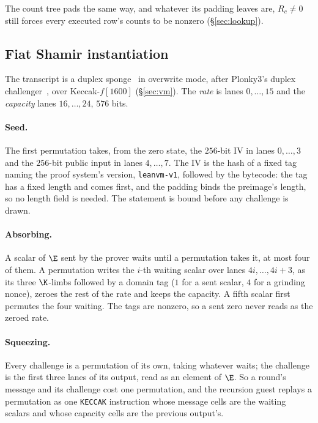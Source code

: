 The count tree pads the same way, and whatever its padding leaves are, $R_c\neq0$ still forces every executed row's counts to be nonzero (\S\ref{sec:lookup}).

\subsection{Fiat Shamir instantiation}\label{sec:e2e-fiat-shamir}

The transcript is a duplex sponge~\cite{BDPV11} in overwrite mode, after Plonky3's duplex challenger~\cite{Plonky3}, over Keccak-$f[1600]$ (\S\ref{sec:vm}). The \emph{rate} is lanes $0,\dots,15$ and the \emph{capacity} lanes $16,\dots,24$, $576$ bits.

\paragraph{Seed.} The first permutation takes, from the zero state, the $256$-bit IV in lanes $0,\dots,3$ and the $256$-bit public input in lanes $4,\dots,7$. The IV is the hash of a fixed tag naming the proof system's version, \texttt{leanvm-v1}, followed by the bytecode: the tag has a fixed length and comes first, and the padding binds the preimage's length, so no length field is needed. The statement is bound before any challenge is drawn.

\paragraph{Absorbing.} A scalar of $\E$ sent by the prover waits until a permutation takes it, at most four of them. A permutation writes the $i$-th waiting scalar over lanes $4i,\dots,4i+3$, as its three $\K$-limbs followed by a domain tag ($1$ for a sent scalar, $4$ for a grinding nonce), zeroes the rest of the rate and keeps the capacity. A fifth scalar first permutes the four waiting. The tags are nonzero, so a sent zero never reads as the zeroed rate.

\paragraph{Squeezing.} Every challenge is a permutation of its own, taking whatever waits; the challenge is the first three lanes of its output, read as an element of $\E$. So a round's message and its challenge cost one permutation, and the recursion guest replays a permutation as one \texttt{KECCAK} instruction whose message cells are the waiting scalars and whose capacity cells are the previous output's.

